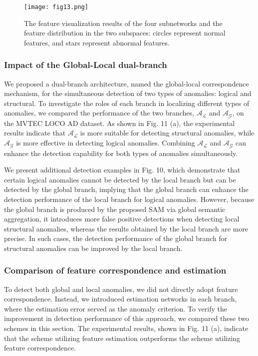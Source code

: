 \documentclass[lettersize,journal]{IEEEtran}
\begin{document}
 \begin{figure}[t]\centering
\texttt{[image: fig13.png]}
\caption{The feature visualization results of the four subnetworks and the feature distribution in the two subspaces: circles represent normal features, and stars represent abnormal features.}
\label{FIG0}
\end{figure}

\subsubsection{Impact of the Global-Local dual-branch}

We proposed a dual-branch architecture, named the global-local correspondence mechanism, for the simultaneous detection of two types of anomalies: logical and structural. To investigate the roles of each branch in localizing different types of anomalies, we compared the performance of the two branches, $\mathcal{A}_{\mathcal{L}}$ and $\mathcal{A}_{\mathcal{G}}$, on the MVTEC LOCO AD dataset. As shown in Fig. 11 (a), the experimental results indicate that $\mathcal{A}_{\mathcal{L}}$ is more suitable for detecting structural anomalies, while $\mathcal{A}_{\mathcal{G}}$ is more effective in detecting logical anomalies. Combining $\mathcal{A}_{\mathcal{L}}$ and $\mathcal{A}_{\mathcal{G}}$ can enhance the detection capability for both types of anomalies simultaneously.

We present additional detection examples in Fig. 10, which demonstrate that certain logical anomalies cannot be detected by the local branch but can be detected by the global branch, implying that the global branch can enhance the detection performance of the local branch for logical anomalies. However, because the global branch is produced by the proposed SAM via global semantic aggregation, it introduces more false positive detections when detecting local structural anomalies, whereas the results obtained by the local branch are more precise. In such cases, the detection performance of the global branch for structural anomalies can be improved by the local branch.


\subsubsection{Comparison of feature correspondence and estimation}

To detect both global and local anomalies, we did not directly adopt feature correspondence. Instead, we introduced estimation networks in each branch, where the estimation error served as the anomaly criterion. To verify the improvement in detection performance of this approach, we compared these two schemes in this section. The experimental results, shown in Fig. 11 (a), indicate that the scheme utilizing feature estimation outperforms the scheme utilizing feature correspondence.
\end{document}
